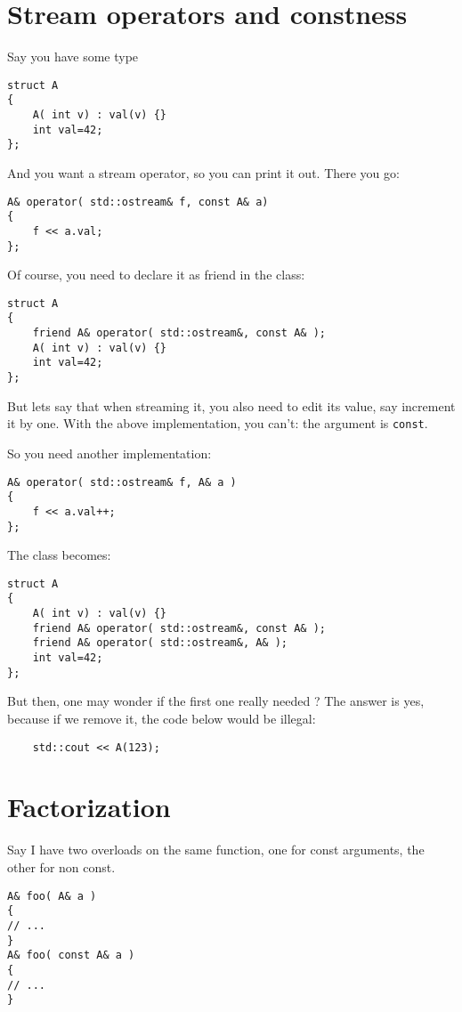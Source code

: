 \documentclass[11pt,a4paper,landscape,twocolumn]{article}
\begin{document}
\section{Stream operators and constness}

Say you have some type
\begin{lstlisting}
struct A
{
	A( int v) : val(v) {}
	int val=42;
};
\end{lstlisting}

And you want a stream operator, so you can print it out.
There you go:

\begin{lstlisting}
A& operator( std::ostream& f, const A& a)
{
	f << a.val;
};
\end{lstlisting}

Of course, you need to declare it as friend in the class:
\begin{lstlisting}
struct A
{
	friend A& operator( std::ostream&, const A& );
	A( int v) : val(v) {}
	int val=42;
};
\end{lstlisting}

But lets say that when streaming it, you also need to edit its value, say increment it by one.
With the above implementation, you can't: the argument is {\tt const}.

So you need another implementation:
\begin{lstlisting}
A& operator( std::ostream& f, A& a )
{
	f << a.val++;
};
\end{lstlisting}

The class becomes:
\begin{lstlisting}
struct A
{
	A( int v) : val(v) {}
	friend A& operator( std::ostream&, const A& );
	friend A& operator( std::ostream&, A& );
	int val=42;
};
\end{lstlisting}

But then, one may wonder if the first one really needed ?
The answer is yes, because if we remove it, the code below would be illegal:
\begin{lstlisting}
	std::cout << A(123);
\end{lstlisting}


\section{Factorization}

Say I have two overloads on the same function, one for const arguments, the other for non const.
\begin{lstlisting}
A& foo( A& a )
{
// ...
}
A& foo( const A& a )
{
// ...
}
\end{lstlisting}
\end{document}
